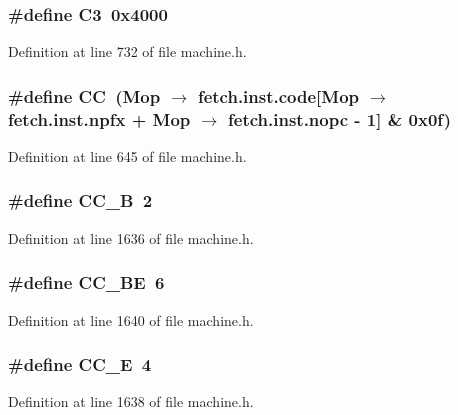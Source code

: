 \subsubsection[{C3}]{\setlength{\rightskip}{0pt plus 5cm}\#define C3~0x4000}\label{machine_8h_58aba30d6a33889c81827a54620dd5d9}




Definition at line 732 of file machine.h.
\subsubsection[{CC}]{\setlength{\rightskip}{0pt plus 5cm}\#define CC~(Mop $\rightarrow$ fetch.inst.code[Mop $\rightarrow$ fetch.inst.npfx + Mop $\rightarrow$ fetch.inst.nopc - 1] \& 0x0f)}\label{machine_8h_78d126676907aa89a0adbfbef8282585}




Definition at line 645 of file machine.h.
\subsubsection[{CC\_\-B}]{\setlength{\rightskip}{0pt plus 5cm}\#define CC\_\-B~2}\label{machine_8h_def6c8a54ebdd07faf9ee4ef14d74c50}




Definition at line 1636 of file machine.h.
\subsubsection[{CC\_\-BE}]{\setlength{\rightskip}{0pt plus 5cm}\#define CC\_\-BE~6}\label{machine_8h_7d5f0479422666966aef1d62b0f130df}




Definition at line 1640 of file machine.h.
\subsubsection[{CC\_\-E}]{\setlength{\rightskip}{0pt plus 5cm}\#define CC\_\-E~4}\label{machine_8h_4b90dab48ec18c6e42fea57e141083fd}




Definition at line 1638 of file machine.h.
